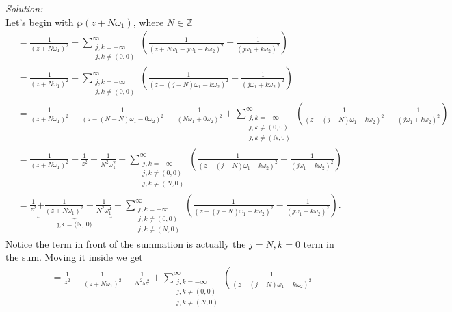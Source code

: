 \documentclass[10pt]{amsart}
\theoremstyle{nonumberplain}
\begin{document}
\begin{enumerate}[label={\bf {\arabic*}:}]
\begin{enumerate}
\noindent
\textit{Solution:} \\
Let's begin with $\wp(z + N \omega_1)$, where $N \in \mathbb Z$
\begin{align*}
	&= \frac{1}{(z + N \omega_1)^2}
		+ \sum_{\substack{j, k=-\infty \\ j,k \neq (0,0)}}^{\infty} \left(
			\frac{1}{\left(z + N \omega_1 - j \omega_1 - k \omega_2 \right)^2}
			- \frac{1}{\left(j \omega_1+k \omega_2\right)^2}
		\right) \\
	&= \frac{1}{(z + N\omega_1)^2}
		+ \sum_{\substack{j, k=-\infty \\ j,k \neq (0,0)}}^{\infty} \left(
			\frac{1}{\left(z - (j - N) \omega_1 - k \omega_2 \right)^2}
			- \frac{1}{\left(j \omega_1+k \omega_2\right)^2}
		\right) \\
	&= \frac{1}{(z + N\omega_1)^2}
		+ \frac{1}{\left(z - (N - N) \omega_1 - 0 \omega_2 \right)^2}
			- \frac{1}{\left(N \omega_1+0 \omega_2\right)^2}
		+ \sum_{\substack{j, k=-\infty \\ j,k \neq (0,0) \\ j,k \neq (N,0)}}^{\infty} \left(
			\frac{1}{\left(z - (j - N) \omega_1 - k \omega_2 \right)^2}
			- \frac{1}{\left(j \omega_1+k \omega_2\right)^2}
		\right) \\
	&= \frac{1}{(z + N\omega_1)^2}
		+ \frac 1 {z^2}
			- \frac 1 {N^2\omega_1^2}
		+ \sum_{\substack{j, k=-\infty \\ j,k \neq (0,0) \\ j,k \neq (N,0)}}^{\infty} \left(
			\frac{1}{\left(z - (j - N) \omega_1 - k \omega_2 \right)^2}
			- \frac{1}{\left(j \omega_1+k \omega_2\right)^2}
		\right) \\
	&= \frac 1 {z^2} 
		\underbrace{+ \frac{1}{(z + N\omega_1)^2} - \frac 1 {N^2\omega_1^2}}_\text{j,k = (N, 0)}
		+ \sum_{\substack{j, k=-\infty \\ j,k \neq (0,0) \\ j,k \neq (N,0)}}^{\infty} \left(
			\frac{1}{\left(z - (j - N) \omega_1 - k \omega_2 \right)^2}
			- \frac{1}{\left(j \omega_1+k \omega_2\right)^2}
		\right).
\end{align*}
Notice the term in front of the summation is actually the $j=N,k=0$ term in the sum.
Moving it inside we get
\begin{align*}
&= \frac 1 {z^2} 
	+ \frac{1}{(z + N\omega_1)^2} - \frac 1 {N^2\omega_1^2}
	+ \sum_{\substack{j, k=-\infty \\ j,k \neq (0,0) \\ j,k \neq (N,0)}}^{\infty} \left(
		\frac{1}{\left(z - (j - N) \omega_1 - k \omega_2 \right)^2}

\end{align*}
\end{enumerate}
\end{enumerate}
\end{document}
